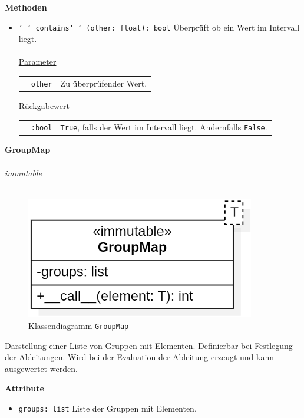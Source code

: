 \documentclass{article}
\begin{document}
\textbf{{Methoden}}
\begin{itemize}
\item \texttt{\char`_\char`_contains\char`_\char`_(other: float): bool} \newline Überprüft ob ein Wert im Intervall liegt.
\\\\
\underline{{Parameter}}

\begin{tabular}{lll}
 & \texttt{other} & Zu überprüfender Wert. \\
\end{tabular}

\underline{{Rückgabewert}}

\begin{tabular}{lll}
 & \texttt{:bool} & \texttt{True}, falls der Wert im Intervall liegt. Andernfalls \texttt{False}. \\
\end{tabular}
\end{itemize}


\newpage
\textbf{\large{GroupMap}}\\\\
\textit{\flqq{}immutable\frqq}\normalsize\\\\
\begin{figure}[H]%
    \centering
    \includegraphics[width=10cm]{entwurf/Entwurf_dokument/img/cls/model/GroupMap.png}
    \caption{Klassendiagramm \texttt{GroupMap}}
\end{figure}

Darstellung einer Liste von Gruppen mit Elementen. Definierbar bei Festlegung der Ableitungen. Wird bei der Evaluation der Ableitung erzeugt und kann ausgewertet werden.
\newline \newline

\textbf{Attribute}
\begin{itemize}
\item \texttt{groups: list} \newline Liste der Gruppen mit Elementen.
\\\\
\end{itemize}
\end{document}
